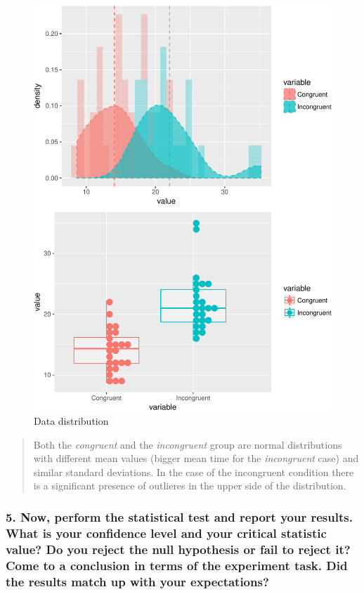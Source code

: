 \documentclass[]{article}
\begin{document}
\begin{figure}
\centering
\includegraphics{P1-Test_a_Perceptual_Phenomenon_files/figure-latex/visualization-1.pdf}
\caption{Data distribution \label{fig1_normal}}
\end{figure}

\begin{quote}
Both the \emph{congruent} and the \emph{incongruent} group are normal
distributions with different mean values (bigger mean time for the
\emph{incongruent} case) and similar standard deviations. In the case of
the incongruent condition there is a significant presence of outlieres
in the upper side of the distribution.
\end{quote}

\subsubsection{5. Now, perform the statistical test and report your
results. What is your confidence level and your critical statistic
value? Do you reject the null hypothesis or fail to reject it? Come to a
conclusion in terms of the experiment task. Did the results match up
with your
expectations?}\label{now-perform-the-statistical-test-and-report-your-results.-what-is-your-confidence-level-and-your-critical-statistic-value-do-you-reject-the-null-hypothesis-or-fail-to-reject-it-come-to-a-conclusion-in-terms-of-the-experiment-task.-did-the-results-match-up-with-your-expectations}
\end{document}
